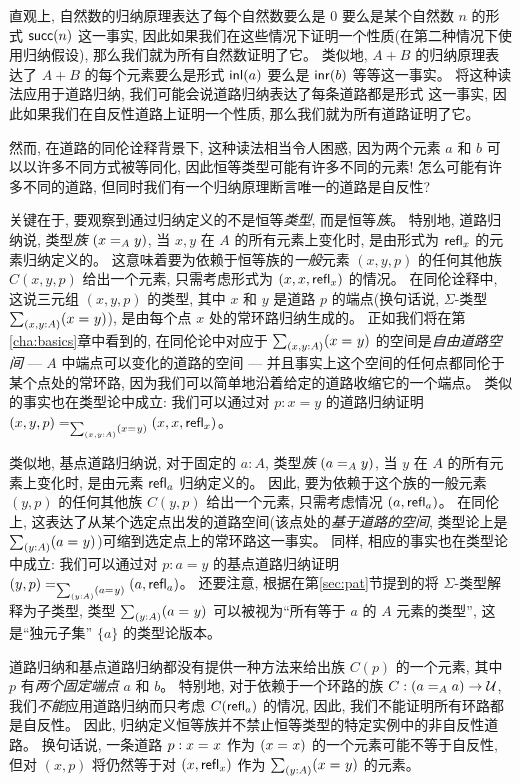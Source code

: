 \begin{rmk}\label{rmk:the-only-path-is-refl}
直观上, 自然数的归纳原理表达了每个自然数要么是 $0$ 要么是某个自然数 $n$ 的形式 $\suc(n)$ 这一事实, 因此如果我们在这些情况下证明一个性质(在第二种情况下使用归纳假设), 那么我们就为所有自然数证明了它。
类似地, $A+B$ 的归纳原理表达了 $A+B$ 的每个元素要么是形式 $\inl(a)$ 要么是 $\inr(b)$ 等等这一事实。
将这种读法应用于道路归纳, 我们可能会说道路归纳表达了每条道路都是形式  这一事实, 因此如果我们在自反性道路上证明一个性质, 那么我们就为所有道路证明了它。

然而, 在道路的同伦诠释背景下, 这种读法相当令人困惑, 因为两个元素 $a$ 和 $b$ 可以以许多不同方式被等同化, 因此恒等类型可能有许多不同的元素!
怎么可能有许多不同的道路, 但同时我们有一个归纳原理断言唯一的道路是自反性?

关键在于, 要观察到通过归纳定义的不是恒等\emph{类型}, 而是恒等\emph{族}。
特别地, 道路归纳说, 类型\emph{族} $(\id[A]{x}{y})$, 当 $x,y$ 在 $A$ 的所有元素上变化时, 是由形式为 $\refl{x}$ 的元素归纳定义的。
这意味着要为依赖于恒等族的\emph{一般}元素 $(x,y,p)$ 的任何其他族 $C(x,y,p)$ 给出一个元素, 只需考虑形式为 $(x,x,\refl{x})$ 的情况。
在同伦诠释中, 这说三元组 $(x,y,p)$ 的类型, 其中 $x$ 和 $y$ 是道路 $p$ 的端点(换句话说, $\Sigma$-类型 $\sm{x,y:A}(\id{x}{y})$), 是由每个点 $x$ 处的常环路归纳生成的。
正如我们将在第\ref{cha:basics}章中看到的, 在同伦论中对应于 $\sm{x,y:A}(\id{x}{y})$ 的空间是\emph{自由道路空间} --- $A$ 中端点可以变化的道路的空间 --- 
并且事实上这个空间的任何点都同伦于某个点处的常环路, 因为我们可以简单地沿着给定的道路收缩它的一个端点。
类似的事实也在类型论中成立: 我们可以通过对 $p:x=y$ 的道路归纳证明 $\id[\sm{x,y:A}(\id{x}{y})]{(x,y,p)}{(x,x,\refl{x})}$。

类似地, 基点道路归纳说, 对于固定的 $a:A$, 类型\emph{族} $(\id[A]{a}{y})$, 当 $y$ 在 $A$ 的所有元素上变化时, 是由元素 $\refl{a}$ 归纳定义的。
因此, 要为依赖于这个族的一般元素 $(y,p)$ 的任何其他族 $C(y,p)$ 给出一个元素, 只需考虑情况 $(a,\refl{a})$。
在同伦上, 这表达了从某个选定点出发的道路空间(该点处的\emph{基于道路的空间}, 类型论上是 $\sm{y:A} (\id{a}{y})$)可缩到选定点上的常环路这一事实。
同样, 相应的事实也在类型论中成立: 我们可以通过对 $p:a=y$ 的基点道路归纳证明 $\id[\sm{y:A}(\id{a}{y})]{(y,p)}{(a,\refl{a})}$。
还要注意, 根据在第\ref{sec:pat}节提到的将 $\Sigma$-类型解释为子类型, 类型 $\sm{y:A}(\id{a}{y})$ 可以被视为``所有等于 $a$ 的 $A$ 元素的类型'', 
这是``独元子集'' $\{a\}$ 的类型论版本。

道路归纳和基点道路归纳都没有提供一种方法来给出族 $C(p)$ 的一个元素, 其中 $p$ 有\emph{两个固定端点} $a$ 和 $b$。
特别地, 对于依赖于一个环路的族 $C: (\id[A]{a}{a}) \to \UU$, 我们\emph{不能}应用道路归纳而只考虑 $C(\refl{a})$ 的情况, 因此, 我们不能证明所有环路都是自反性。
因此, 归纳定义恒等族并不禁止恒等类型的特定实例中的非自反性道路。
换句话说, 一条道路 $p:\id{x}{x}$ 作为 $(\id{x}{x})$ 的一个元素可能不等于自反性, 但对 $(x,p)$ 将仍然等于对 $(x,\refl{x})$ 作为 $\sm{y:A}(\id{x}{y})$ 的元素。


\end{rmk}
